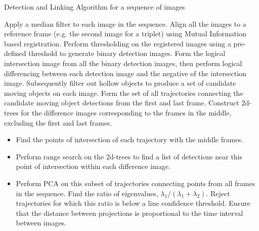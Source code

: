 \documentclass{article}
\begin{document}
\vspace{-0.1cm}
\begin{algorithm}[H]
\small
\caption{Detection and Linking Algorithm for a sequence of images}
\label{algo:Trajectory_Linking}
\begin{algorithmic}[1]
\State Apply a median filter to each image in the sequence.
\State Align all the images to a reference frame (e.g. the second image for a triplet) using Mutual Information based registration.
\State Perform thresholding on the registered images using a pre-defined threshold to generate  binary detection images. 
\State Form the logical intersection image from all the binary detection images, then perform logical differencing between each detection image and the negative of the intersection image.
\State Subsequently filter out hollow objects to produce a set of candidate moving objects on each image.  
\State Form the set of all trajectories connecting the candidate moving object detections from the first and last frame.
\State Construct 2d-trees for the difference images corresponding to the frames in the middle, excluding the first and last frames. 
\begin{itemize}
    \item{Find the points of intersection of each trajectory with the middle frames.}
    \item{Perform range search on the 2d-trees to find a list of detections near this point of intersection within each difference image.}
    \item{Perform PCA on this subset of trajectories connecting points from all frames in the sequence. Find the ratio of eigenvalues, $\lambda_{1}/(\lambda_{1}+ \lambda_{2})$. Reject trajectories for which this ratio is below a line confidence threshold. Ensure that the distance between projections is proportional to the time interval between images.}
\end{itemize}     
\end{algorithmic}
\label{code}
\end{algorithm}
\end{document}
